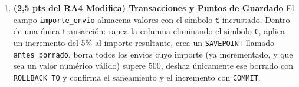 \documentclass[a4paper,11pt]{article}
\begin{document}
\begin{Form}
\begin{enumerate}[leftmargin=*, label=\textbf{Pregunta \arabic*:}]
    \item \textbf{(2,5 pts del RA4 Modifica) Transacciones y Puntos de Guardado}
    El campo \texttt{importe\_envio} almacena valores con el símbolo \texttt{€} incrustado. Dentro de una única transacción: sanea la columna eliminando el símbolo \texttt{€}, aplica un incremento del 5\% al importe resultante, crea un \texttt{SAVEPOINT} llamado \texttt{antes\_borrado}, borra todos los envíos cuyo importe (ya incrementado, y que sea un valor numérico válido) supere 500, deshaz únicamente ese borrado con \texttt{ROLLBACK TO} y confirma el saneamiento y el incremento con \texttt{COMMIT}.

\end{enumerate}

\end{Form}
\end{document}
